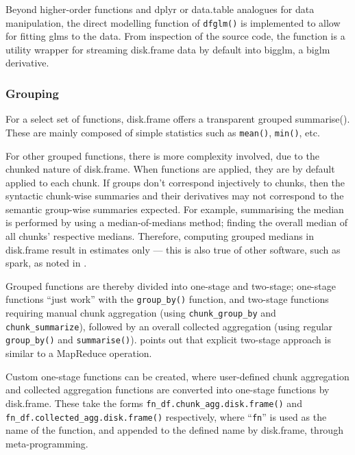 \documentclass[a4paper,10pt]{article}
\begin{document}
Beyond higher-order functions and dplyr or data.table analogues for
data manipulation, the direct modelling function of \texttt{dfglm()}
is implemented to allow for fitting glms to the data. From inspection
of the source code, the function is a utility wrapper for streaming
disk.frame data by default into bigglm, a biglm derivative.

\subsubsection{Grouping}
\label{sec:spec-cons-group-by}

For a select set of functions, disk.frame offers a transparent grouped
\textrm{summarise()}. These are mainly composed of simple statistics
such as \texttt{mean()}, \texttt{min()}, etc.

For other grouped functions, there is more complexity involved, due to
the chunked nature of disk.frame. When functions are applied, they are
by default applied to each chunk. If groups don't correspond
injectively to chunks, then the syntactic chunk-wise summaries and
their derivatives may not correspond to the semantic group-wise
summaries expected. For example, summarising the median is performed
by using a median-of-medians method; finding the overall median of all
chunks' respective medians. Therefore, computing grouped medians in
disk.frame result in estimates only --- this is also true of other
software, such as spark, as noted in \textcite{zj19:_group_by}.

Grouped functions are thereby divided into one-stage and two-stage;
one-stage functions ``just work'' with the \texttt{group\_by()}
function, and two-stage functions requiring manual chunk aggregation
(using \texttt{chunk\_group\_by} and \texttt{chunk\_summarize}),
followed by an overall collected aggregation (using regular
\texttt{group\_by()} and \texttt{summarise()}).
\textcite{zj19:_group_by} points out that explicit two-stage approach
is similar to a MapReduce operation.

Custom one-stage functions can be created, where user-defined chunk
aggregation and collected aggregation functions are converted into
one-stage functions by
disk.frame\cite{zj19:_custom_one_stage_group_by_funct}. These take the
forms \texttt{fn\_df.chunk\_agg.disk.frame()} and
\texttt{fn\_df.collected\_agg.disk.frame()} respectively, where
``\texttt{fn}'' is used as the name of the function, and appended to
the defined name by disk.frame, through meta-programming.
\end{document}
